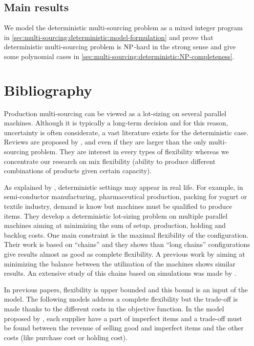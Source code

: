 \subsection{Main results}
\label{sec:multi-sourcing:deterministic:introduction:main_results}


We model the deterministic multi-sourcing problem as a mixed integer program in \cref{sec:multi-sourcing:deterministic:model-formulation} and prove that deterministic multi-sourcing problem is $\operatorname{NP}$-hard in the strong sense and give some polynomial cases in \cref{sec:multi-sourcing:deterministic:NP-completeness}.




\section{Bibliography}



Production multi-sourcing can be viewed as a lot-sizing on several parallel machines.
Although it is typically a long-term decision and for this reason, uncertainty is often considerate, a vast literature exists for the deterministic case.
Reviews are proposed by \citet{Sethi1990}, \citet{Koste1999} and \citet{Stevenson2007} even if they are larger than the only multi-sourcing problem.
They are interest in every types of flexibility whereas we concentrate our research on mix flexibility (ability to produce different combinations of products given certain capacity).


As explained by \citet{Fiorotto2018}, deterministic settings may appear in real life.
For example, in semi-conductor manufacturing, pharmaceutical production, packing for yogurt or textile industry, demand is know but machines must be qualified to produce items.
They develop a deterministic lot-sizing problem on multiple parallel machines aiming at minimizing the sum of setup, production, holding and backlog costs.
One main constraint is the maximal flexibility of the configuration.
Their work is based on ``chains'' and they shows than ``long chains'' configurations give results almost as good as complete flexibility.
A previous work by \citet{Ignizio2009} aiming at minimizing the balance between the utilization of the machines shows similar results.
An extensive study of this chains based on simulations was made by \citet{Muriel2006}.


In previous papers, flexibility is upper bounded and this bound is an input of the model.
The following models address a complete flexibility but the trade-off is made thanks to the different costs in the objective function.
In the model proposed by \citet{Rezaei2008}, each supplier have a part of imperfect items and a trade-off must be found between the revenue of selling good and imperfect items and the other costs (like purchase cost or holding cost).


